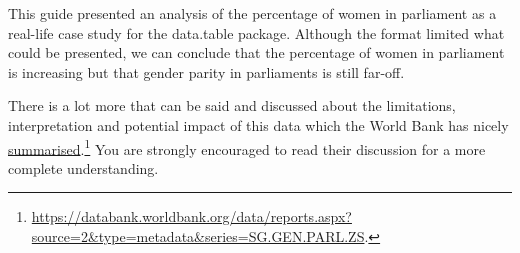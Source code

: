 \documentclass[a4paper,9pt,twocolumn,twoside,printwatermark=true]{pinp}
\begin{document}
This guide presented an analysis of the percentage of women in
parliament as a real-life case study for the data.table package.
Although the format limited what could be presented, we can conclude
that the percentage of women in parliament is increasing but that gender
parity in parliaments is still far-off.

There is a lot more that can be said and discussed about the
limitations, interpretation and potential impact of this data which the
World Bank has nicely
\href{https://databank.worldbank.org/data/reports.aspx?source=2\&type=metadata\&series=SG.GEN.PARL.ZS\#}{summarised}.\footnote{\url{https://databank.worldbank.org/data/reports.aspx?source=2\&type=metadata\&series=SG.GEN.PARL.ZS}.}
You are strongly encouraged to read their discussion for a more complete
understanding.





\end{document}
